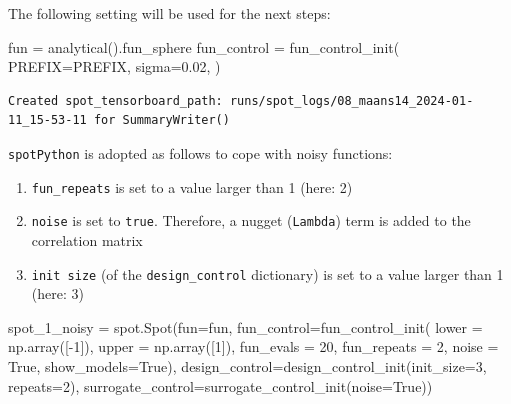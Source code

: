 \documentclass[
  letterpaper,
  DIV=11,
  numbers=noendperiod]{scrreprt}
\newenvironment{Shaded}{\begin{snugshade}}{\end{snugshade}}
\newcommand{\DecValTok}[1]{\textcolor[rgb]{0.68,0.00,0.00}{#1}}
\newcommand{\FloatTok}[1]{\textcolor[rgb]{0.68,0.00,0.00}{#1}}
\newcommand{\NormalTok}[1]{\textcolor[rgb]{0.00,0.23,0.31}{#1}}
\newcommand{\OperatorTok}[1]{\textcolor[rgb]{0.37,0.37,0.37}{#1}}
\newcommand{\VariableTok}[1]{\textcolor[rgb]{0.07,0.07,0.07}{#1}}
\providecommand{\tightlist}{%
  \setlength{\itemsep}{0pt}\setlength{\parskip}{0pt}}\usepackage{longtable,booktabs,array}
\begin{document}
The following setting will be used for the next steps:

\begin{Shaded}
\begin{Highlighting}[]
\NormalTok{fun }\OperatorTok{=}\NormalTok{ analytical().fun\_sphere}
\NormalTok{fun\_control }\OperatorTok{=}\NormalTok{ fun\_control\_init(}
\NormalTok{    PREFIX}\OperatorTok{=}\NormalTok{PREFIX,}
\NormalTok{    sigma}\OperatorTok{=}\FloatTok{0.02}\NormalTok{,}
\NormalTok{)}
\end{Highlighting}
\end{Shaded}

\begin{verbatim}
Created spot_tensorboard_path: runs/spot_logs/08_maans14_2024-01-11_15-53-11 for SummaryWriter()
\end{verbatim}

\texttt{spotPython} is adopted as follows to cope with noisy functions:

\begin{enumerate}
\def\labelenumi{\arabic{enumi}.}
\tightlist
\item
  \texttt{fun\_repeats} is set to a value larger than 1 (here: 2)
\item
  \texttt{noise} is set to \texttt{true}. Therefore, a nugget
  (\texttt{Lambda}) term is added to the correlation matrix
\item
  \texttt{init\ size} (of the \texttt{design\_control} dictionary) is
  set to a value larger than 1 (here: 3)
\end{enumerate}

\begin{Shaded}
\begin{Highlighting}[]
\NormalTok{spot\_1\_noisy }\OperatorTok{=}\NormalTok{ spot.Spot(fun}\OperatorTok{=}\NormalTok{fun,}
\NormalTok{                   fun\_control}\OperatorTok{=}\NormalTok{fun\_control\_init(}
\NormalTok{                                    lower }\OperatorTok{=}\NormalTok{ np.array([}\OperatorTok{{-}}\DecValTok{1}\NormalTok{]),}
\NormalTok{                                    upper }\OperatorTok{=}\NormalTok{ np.array([}\DecValTok{1}\NormalTok{]),}
\NormalTok{                                    fun\_evals }\OperatorTok{=} \DecValTok{20}\NormalTok{,}
\NormalTok{                                    fun\_repeats }\OperatorTok{=} \DecValTok{2}\NormalTok{,}
\NormalTok{                                    noise }\OperatorTok{=} \VariableTok{True}\NormalTok{,}
\NormalTok{                                    show\_models}\OperatorTok{=}\VariableTok{True}\NormalTok{),}
\NormalTok{                   design\_control}\OperatorTok{=}\NormalTok{design\_control\_init(init\_size}\OperatorTok{=}\DecValTok{3}\NormalTok{, repeats}\OperatorTok{=}\DecValTok{2}\NormalTok{),}
\NormalTok{                   surrogate\_control}\OperatorTok{=}\NormalTok{surrogate\_control\_init(noise}\OperatorTok{=}\VariableTok{True}\NormalTok{))}
\end{Highlighting}
\end{Shaded}
\end{document}
